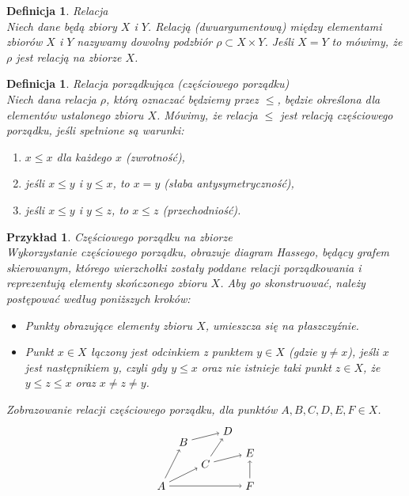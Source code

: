 \documentclass[12pt,a4paper]{report}
\newtheorem{definition}[theorem]{Definicja}
\newtheorem{example}{Przykład}
\begin{document}
\begin{definition}{Relacja \cite[Rozdział 3]{kuratowski2004}}\\
Niech dane będą zbiory $X$ i $Y$. Relacją (dwuargumentową) między elementami zbiorów $X$ i $Y$ nazywamy dowolny podzbiór $\rho \subset X \times Y $. Jeśli $X=Y$ to mówimy, że $\rho$ jest relacją na zbiorze $X$. 
\end{definition} 


\begin{definition}{Relacja porządkująca (częściowego porządku) \cite[Rozdział 2]{blaszczyk2007}}\label{def-relacja-czesciowego-porzadku}\\
Niech dana relacja $\rho$, którą oznaczać będziemy przez $\leq$, będzie określona dla elementów ustalonego zbioru $X$. Mówimy, że relacja $\leq$ jest relacją częściowego porządku, jeśli spełnione są warunki:
\begin{enumerate}
\item $x \leq x$ dla każdego $x$ (zwrotność),
\item jeśli $x \leq y$ i $y \leq x$, to $x=y$ (słaba antysymetryczność),
\item jeśli $x \leq y$ i $y \leq z$, to $x \leq z$ (przechodniość).
\end{enumerate}
\end{definition}


\begin{example}{Częściowego porządku na zbiorze}\label{przyklad-czesciowy-porzadek}\\
Wykorzystanie częściowego porządku, obrazuje diagram Hassego, będący grafem skierowanym, którego wierzchołki zostały poddane relacji porządkowania i reprezentują elementy  skończonego zbioru $X$. 
Aby go skonstruować, należy postępować według poniższych kroków:
\begin{itemize}
\item Punkty obrazujące elementy zbioru $X$, umieszcza się na płaszczyźnie.
\item Punkt $x\in X$ łączony jest odcinkiem z punktem $y \in X$ (gdzie $y\neq x$), jeśli $x$ jest następnikiem $y$, czyli gdy $y \leq x$ oraz nie istnieje taki punkt $z \in X$, że $y\leq z\leq x$ oraz $x\neq z \neq y$.
\end{itemize}
Zobrazowanie relacji częściowego porządku, dla punktów $A, B, C, D, E, F \in X$.
$$
\begin{tikzpicture}[scale=.7]
  \node (A) at (-1,0) {$A$};
  \node (B) at (0,2) {$B$};
  \node (C) at (1,1) {$C$};
 \node (E) at (3,1.5) {$E$};
 \node (F) at (3,0) {$F$};
 \node (D) at (2,2.5) {$D$};
 \draw [->](A) --(C);
 \draw [->](A) --(B);
 \draw [->](B) --(D);
 \draw [->](C) --(D);
 \draw [->](C) --(E);
 \draw [->](A) --(F);
 \draw [->](F) --(E);
 
\end{tikzpicture}
$$
\end{example}
\end{document}
